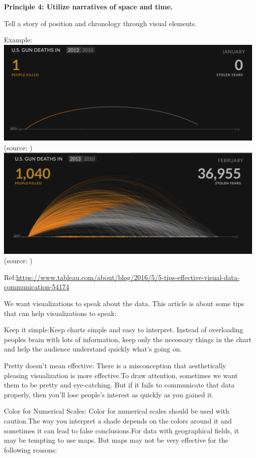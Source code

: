 \documentclass[]{book}
\theoremstyle{definition}
\theoremstyle{definition}
\theoremstyle{definition}
\theoremstyle{remark}
\begin{document}
\textbf{Principle 4: Utilize narratives of space and time.}

Tell a story of position and chronology through visual elements.

Example:\\
\includegraphics{images/Tufte_figure11.png} (source:
\citep{narratives_2017})\\
\includegraphics{images/Tufte_figure12.png} (source:
\citep{narratives_2017})

Ref:\url{https://www.tableau.com/about/blog/2016/5/5-tips-effective-visual-data-communication-54174}

We want visualizations to speak about the data. This article is about
some tips that can help visualizations to speak:

Keep it simple:Keep charts simple and easy to interpret. Instead of
overloading peoples brain with lots of information, keep only the
necessary things in the chart and help the audience understand quickly
what's going on.

Pretty doesn't mean effective: There is a misconception that
aesthetically pleasing visualization is more effective.To draw
attention, sometimes we want them to be pretty and eye-catching. But if
it fails to communicate that data properly, then you'll lose people's
interest as quickly as you gained it.

Color for Numerical Scales: Color for numerical scales should be used
with caution.The way you interpret a shade depends on the colors around
it and sometimes it can lead to false conclusions.For data with
geographical fields, it may be tempting to use maps. But maps may not be
very effective for the following reasons:
\end{document}
